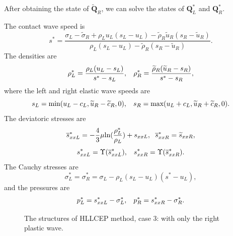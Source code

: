 \documentclass{article}
\numberwithin{equation}{section}
\numberwithin{table}{section}
\begin{document}
After obtaining the state of $\widetilde{\bm{Q}}_R$, we can solve the states of $\bm{Q}_L^*$ and  $\bm{Q}_R^*$.

The contact wave speed is
\begin{equation}
  s^* = \frac{\sigma_L-\widetilde{\sigma}_R+\rho_L u_L(s_L-u_L)-\widetilde{\rho}_R \widetilde{u}_R(s_R-\widetilde{u}_R)}{\rho_L(s_L-u_L)-\widetilde{\rho}_R(s_R-\widetilde{u}_R)}.
\end{equation}
The densities are
\begin{equation}\label{eq:rhoLs}
  \rho_L^* = \frac{\rho_L(u_L-s_L)}{s^*-s_L}, \hspace{0.3cm}  \rho_R^* = \frac{\widetilde{\rho}_R(\widetilde{u}_R-s_R)}{s^*-s_R},
\end{equation}
where the left and right elastic wave speeds are
	\begin{equation}
	  s_L = \text{min} (u_L-c_L, \widetilde{u}_R-\widetilde{c}_R,0), \hspace{0.3cm} s_R = \text{max}(u_L+c_L, \widetilde{u}_R+\widetilde{c}_R,0).
	\end{equation}
	The deviatoric stresses are
\begin{equation}
  \overline{s}_{xxL}^*=-\frac{4}{3}\mu\text{ln}(\frac{\rho_L^*}{\rho_L})+s_{xxL},\hspace{0.2cm}  \overline{s}_{xxR}^*=\widetilde{s}_{xxR},
\end{equation}
\begin{equation}
  s_{xxL}^* = \Upsilon(\overline{s}_{xxL}^*), \hspace{0.3cm}  s_{xxR}^* = \Upsilon(\overline{s}_{xxR}^*).
\end{equation}
The Cauchy stresses are
\begin{equation}
  \sigma_L^*=\sigma_R^*=\sigma_L -\rho_L (s_L-u_L)(s^*-u_L),
\end{equation}
and the pressures are
\begin{equation}
  p_L^* = s_{xxL}^* - \sigma_L^*, \hspace{0.3cm}   p_R^* = s_{xxR}^* - \sigma_R^*.
\end{equation}

\begin{figure}
  \centering
\caption{The  structures of HLLCEP method, case 3: with only  the right  plastic wave.}
\label{fig:case3}
\end{figure}
\end{document}
